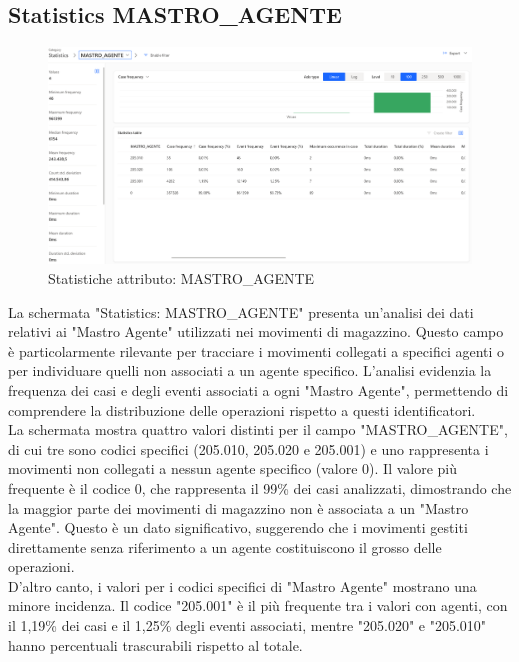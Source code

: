 \documentclass{article}
\begin{document}
\subsection{Statistics MASTRO\_AGENTE}
\begin{figure}[H]
    \centering
    \includegraphics[width=\textwidth]{imgMicrosoft/DatiReali/StatisticsMASTROAGENTEDatiReali.png}
    \caption{Statistiche attributo: MASTRO\_AGENTE}
    \label{fig:statistics-MASTRO-AGENTE}
\end{figure}
La schermata "Statistics: MASTRO\_AGENTE" presenta un'analisi dei dati relativi ai "Mastro Agente" utilizzati nei movimenti di magazzino. Questo campo è particolarmente rilevante per tracciare i movimenti collegati a specifici agenti o per individuare quelli non associati a un agente specifico. L'analisi evidenzia la frequenza dei casi e degli eventi associati a ogni "Mastro Agente", permettendo di comprendere la distribuzione delle operazioni rispetto a questi identificatori.\\
La schermata mostra quattro valori distinti per il campo "MASTRO\_AGENTE", di cui tre sono codici specifici (205.010, 205.020 e 205.001) e uno rappresenta i movimenti non collegati a nessun agente specifico (valore 0). Il valore più frequente è il codice 0, che rappresenta il 99\% dei casi analizzati, dimostrando che la maggior parte dei movimenti di magazzino non è associata a un "Mastro Agente". Questo è un dato significativo, suggerendo che i movimenti gestiti direttamente senza riferimento a un agente costituiscono il grosso delle operazioni.\\
D'altro canto, i valori per i codici specifici di "Mastro Agente" mostrano una minore incidenza. Il codice "205.001" è il più frequente tra i valori con agenti, con il 1,19\% dei casi e il 1,25\% degli eventi associati, mentre "205.020" e "205.010" hanno percentuali trascurabili rispetto al totale.
\end{document}
